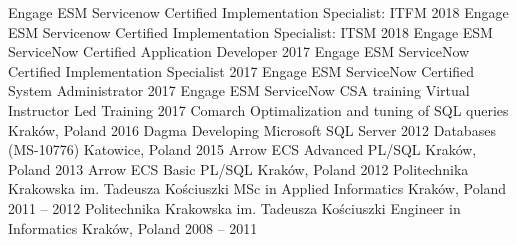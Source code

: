 \begin{cventries}
	\cventry
		{Engage ESM}
		{Servicenow Certified Implementation Specialist: ITFM}
		{}
		{2018}
		{}
	\cventry
		{Engage ESM}
		{Servicenow Certified Implementation Specialist: ITSM}
		{}
		{2018}
		{}
	\cventry
		{Engage ESM}
		{ServiceNow Certified Application Developer}
		{}
		{2017}
		{}
	\cventry
		{Engage ESM}
		{ServiceNow Certified Implementation Specialist}
		{}
		{2017}
		{}
	\cventry
		{Engage ESM}
		{ServiceNow Certified System Administrator}
		{}
		{2017}
		{}
	\cventry
		{Engage ESM}
		{ServiceNow CSA training}
		{Virtual Instructor Led Training}
		{2017}
		{}
	\cventry
		{Comarch}
		{Optimalization and tuning of SQL queries}
		{Kraków, Poland}
		{2016}
		{}
  	\cventry
  		{Dagma}
  		{Developing Microsoft SQL Server 2012 Databases (MS-10776)}
  		{Katowice, Poland}
  		{2015}
  		{}
  	\cventry
  		{Arrow ECS}
  		{Advanced PL/SQL}
  		{Kraków, Poland}
  		{2013}
  		{}
  	\cventry
		{Arrow ECS}
		{Basic PL/SQL}
		{Kraków, Poland}
		{2012}
		{}
  	\cventry
  		{Politechnika Krakowska im. Tadeusza Kościuszki}
    	{MSc in Applied Informatics}
    	{Kraków, Poland}
    	{2011 -- 2012}
    	{}
  	\cventry
    	{Politechnika Krakowska im. Tadeusza Kościuszki}
    	{Engineer in Informatics}
    	{Kraków, Poland}
    	{2008 -- 2011}
    	{}
\end{cventries}
